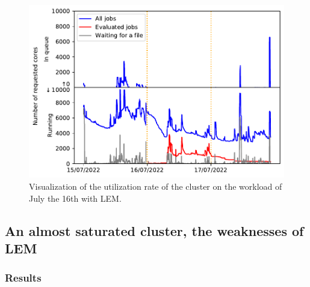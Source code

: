 \documentclass[conference,10pt]{IEEEtran}
\begin{document}
\begin{figure}[H]\centering\includegraphics[scale=0.47]{../MBSS/plot/Cluster_usage/2022-07-16->2022-07-16_V10000_Fcfs_with_a_score_mixed_strategy_x500_x1_x0_x0_Used_nodes_Reduced_450_128_32_256_4_1024_core_by_core.pdf}\caption{Visualization of the utilization rate of the cluster on the workload of July the 16th with LEM.}\end{figure}


\subsection{An almost saturated cluster, the weaknesses of LEM}

\subsubsection{Results}
\end{document}
